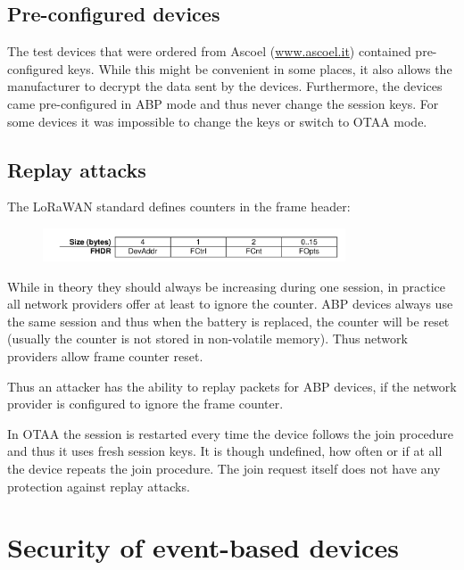\section{Pre-configured devices}\label{h.7mkfizapvt5a}

{The test devices that were ordered from Ascoel
(\href{http://www.ascoel.it}{www.ascoel.it})
contained pre-configured keys. While this might be convenient in some
places, it also allows the manufacturer to decrypt the data sent by the
devices. Furthermore, the devices came pre-configured in ABP mode and
thus never change the session keys. For some devices it was impossible
to change the keys or switch to OTAA mode.}

\section{\texorpdfstring{{Replay
attacks}}{Replay attacks}}\label{h.eymg8atzq5bp}


{The LoRaWAN standard defines counters in the frame header:}

\begin{figure}[h!]
{\includegraphics[width=0.8\textwidth]{images/image9.png}}
\end{figure}

{While in theory they should always be increasing during one session, in
practice all network providers offer at least to ignore the counter. ABP
devices always use the same session and thus when the battery is
replaced, the counter will be reset (usually the counter is not stored in
non-volatile memory). Thus network providers allow frame counter reset.}

{Thus an attacker has the ability to replay packets for ABP devices, if
the network provider is configured to ignore the frame counter.}

{In OTAA the session is restarted every time the device follows the join
procedure and thus it uses fresh session keys. It is though undefined,
how often or if at all the device repeats the join procedure. The join
request itself does not have any protection against replay attacks.}

\hypertarget{h.1a3modh2fhpw}{\chapter{\texorpdfstring{{Security of
event-based
devices}}{Security of event-based devices}}\label{h.1a3modh2fhpw}}

